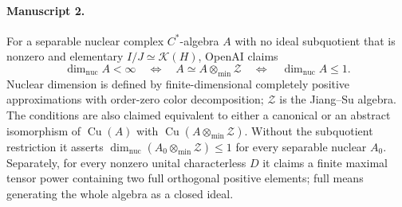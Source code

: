 \documentclass[11pt]{article}
\begin{document}
\paragraph{Manuscript 2.}
For a separable nuclear complex $C^*$-algebra $A$ with no ideal subquotient that is nonzero and elementary $I/J\simeq\mathcal K(H)$, OpenAI claims
\[
\dim_{\mathrm{nuc}}A<\infty\quad\Longleftrightarrow\quad
A\simeq A\otimes_{\min}\mathcal Z\quad\Longleftrightarrow\quad\dim_{\mathrm{nuc}}A\le1.
\]
Nuclear dimension is defined by finite-dimensional completely positive approximations with order-zero color decomposition; $\mathcal Z$ is the Jiang--Su algebra. The conditions are also claimed equivalent to either a canonical or an abstract isomorphism of $\operatorname{Cu}(A)$ with $\operatorname{Cu}(A\otimes_{\min}\mathcal Z)$. Without the subquotient restriction it asserts $\dim_{\mathrm{nuc}}(A_0\otimes_{\min}\mathcal Z)\le1$ for every separable nuclear $A_0$. Separately, for every nonzero unital characterless $D$ it claims a finite maximal tensor power containing two full orthogonal positive elements; full means generating the whole algebra as a closed ideal.
\end{document}
